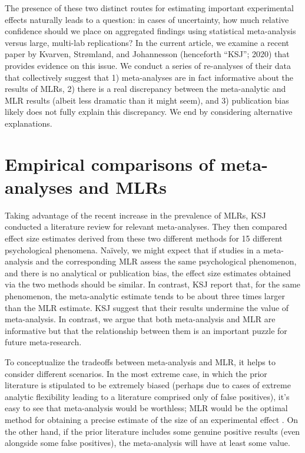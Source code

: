 \documentclass[man,floatsintext]{apa7}
\begin{document}
The presence of these two distinct routes for estimating important experimental effects naturally leads to a question: in cases of uncertainty, how much relative confidence should we place on aggregated findings using statistical meta-analysis versus large, multi-lab replications? In the current article, we examine a recent paper by Kvarven, Strømland, and Johannesson (henceforth ``KSJ''; 2020) that provides evidence on this issue. We conduct a series of re-analyses of their data that collectively suggest that 1) meta-analyses are in fact informative about the results of MLRs, 2) there is a real discrepancy between the meta-analytic and MLR results (albeit less dramatic than it might seem), and 3) publication bias likely does not fully explain this discrepancy. We end by considering alternative explanations. 

\section{Empirical comparisons of meta-analyses and MLRs}

Taking advantage of the recent increase in the prevalence of MLRs, KSJ conducted a literature review for relevant meta-analyses. They then compared effect size estimates derived from these two different methods for 15 different psychological phenomena. Na{\"i}vely, we might expect that if studies in a meta-analysis and the corresponding MLR assess the same psychological phenomenon, and there is no analytical or publication bias, the effect size estimates obtained via the two methods should be similar.  In contrast, KSJ report that, for the same phenomenon, the meta-analytic estimate tends to be about three times larger than the MLR estimate. KSJ suggest that their results undermine the value of meta-analysis. In contrast, we argue that both meta-analysis and MLR are informative but that the relationship between them is an important puzzle for future meta-research. 

To conceptualize the tradeoffs between meta-analysis and MLR, it helps to consider different scenarios. In the most extreme case, in which the prior literature is stipulated to be extremely biased (perhaps due to cases of extreme analytic flexibility leading to a literature comprised only of false positives), it’s easy to see that meta-analysis would be worthless; MLR would be the optimal method for obtaining a precise estimate of the size of an experimental effect \parencite[for a possible example of this type, see e.g.][]{vadillo2016selection}. On the other hand, if the prior literature includes some genuine positive results (even alongside some false positives), the meta-analysis will have at least some value. 
\end{document}
